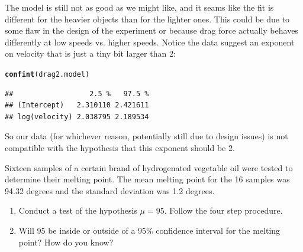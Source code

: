 \documentclass[twoside]{book}
\makeatletter
\newcommand{\hlstd}[1]{\textcolor[rgb]{0.345,0.345,0.345}{#1}}%
\newcommand{\hlkwd}[1]{\textcolor[rgb]{0.737,0.353,0.396}{\textbf{#1}}}%
\newenvironment{kframe}{%
 \def\at@end@of@kframe{}%
 \ifinner\ifhmode%
  \def\at@end@of@kframe{\end{minipage}}%
  \begin{minipage}{\columnwidth}%
 \fi\fi%
 \def\FrameCommand##1{\hskip\@totalleftmargin \hskip-\fboxsep
 \colorbox{shadecolor}{##1}\hskip-\fboxsep
     \hskip-\linewidth \hskip-\@totalleftmargin \hskip\columnwidth}%
 \MakeFramed {\advance\hsize-\width
   \@totalleftmargin\z@ \linewidth\hsize
   \@setminipage}}%
 {\par\unskip\endMakeFramed%
 \at@end@of@kframe}
\newenvironment{knitrout}{}{} %
\makeatother
\begin{document}
\begin{solution}
\begin{knitrout}
{}



\end{knitrout}
The model is still not as good as we might like, and it seams like the fit is different for the 
heavier objects than for the lighter ones.  This could be due to some flaw in the design of the 
experiment or because drag force actually behaves differently at low speeds vs. higher speeds.
Notice the data suggest an exponent on velocity that is just a tiny bit larger than 2:
\begin{knitrout}
\color{fgcolor}\begin{kframe}
\begin{alltt}
\hlkwd{confint}\hlstd{(drag2.model)}
\end{alltt}
\begin{verbatim}
##                  2.5 %   97.5 %
## (Intercept)   2.310110 2.421611
## log(velocity) 2.038795 2.189534
\end{verbatim}
\end{kframe}
\end{knitrout}
So our data (for whichever reason, potentially still due to design issues) is not compatible 
with the hypothesis that this exponent should be 2.
\end{solution}

\begin{problem}
	Sixteen samples of a certain brand of hydrogenated vegetable oil were tested to determine 
	their melting point.  The mean melting point for the 16 samples was 94.32 degrees 
	and the standard deviation was 1.2 degrees.

	\begin{enumerate}
		\item
    Conduct a test of the hypothesis $\mu = 95$.  Follow the four step procedure.
\item
	Will 95 be inside or outside of a 95\% confidence interval for the melting point?
	How do you know?
	\end{enumerate}
\end{problem}
\end{document}
